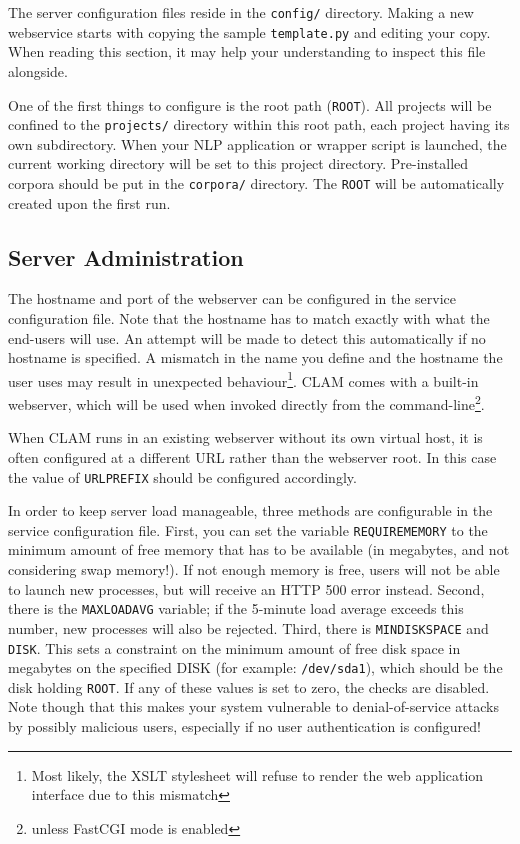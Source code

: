 \documentclass[a4paper,12pt]{report}
\begin{document}
The server configuration files reside in the \texttt{config/} directory. Making
a new webservice starts with copying the sample \texttt{template.py} and
editing your copy. When reading this section, it may help your understanding to
inspect this file alongside.

One of the first things to configure is the root path (\texttt{ROOT}). All
projects will be confined to the \texttt{projects/} directory within this root
path, each project having its own subdirectory. When your NLP application or
wrapper script is launched, the current working directory will be set to this
project directory. Pre-installed corpora should be put in the \texttt{corpora/}
directory. The \texttt{ROOT} will be automatically created upon the first run.


\subsection{Server Administration}
\label{sec:sadmin}

The hostname and port of the webserver can be configured in the service
configuration file. Note that the hostname has to match exactly with what the
end-users will use. An attempt will be made to detect this automatically if no
hostname is specified. A mismatch in the name you define and the hostname the
user uses may result in unexpected behaviour\footnote{Most likely, the XSLT
stylesheet will refuse to render the web application interface due to this
mismatch}. CLAM comes with a built-in webserver, which will be used when
invoked directly from the command-line\footnote{unless FastCGI mode is
enabled}.

When CLAM runs in an existing webserver without its own virtual host, it is
often configured at a different URL rather than the webserver root. In this
case the value of \texttt{URLPREFIX} should be configured accordingly.

In order to keep server load manageable, three methods are configurable in the
service configuration file. First, you can set the variable
\texttt{REQUIREMEMORY} to the minimum amount of free memory that has to be
available (in megabytes, and not considering swap memory!). If not enough
memory is free, users will not be able to launch new processes, but will
receive an HTTP 500 error instead. Second, there is the \texttt{MAXLOADAVG}
variable; if the 5-minute load average exceeds this number, new processes will
also be rejected. Third, there is \texttt{MINDISKSPACE} and \texttt{DISK}. This
sets a constraint on the minimum amount of free disk space in megabytes on the
specified DISK (for example: \texttt{/dev/sda1}), which should be the disk
holding \texttt{ROOT}. If any of these values is set to zero, the checks are
disabled. Note though that this makes your system vulnerable to
denial-of-service attacks by possibly malicious users, especially if no user
authentication is configured!
\end{document}
